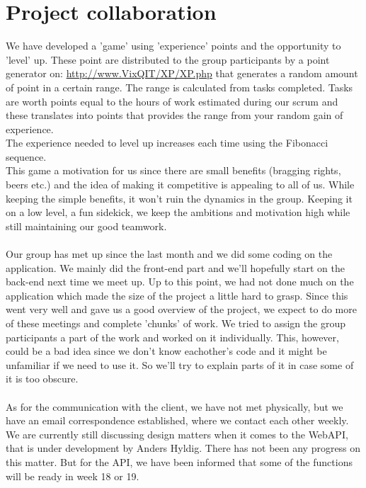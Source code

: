 \documentclass[12pt]{article}
\begin{document}
\section{Project collaboration}
We have developed a 'game' using 'experience' points and the opportunity to 'level' up. These point are distributed to the group participants by a point generator on: \url{http://www.VixQIT/XP/XP.php}
that generates a random amount of point in a certain range. The range is calculated from tasks completed. Tasks are worth points equal to the hours of work estimated during our scrum and these translates into points that provides the range from your random gain of experience.\\
The experience needed to level up increases each time using the Fibonacci sequence.\\
This game a motivation for us since there are small benefits (bragging rights, beers etc.) and the idea of making it competitive is appealing to all of us. While keeping the simple benefits, it won't ruin the dynamics in the group. Keeping it on a low level, a fun sidekick, we keep the ambitions and motivation high while still maintaining our good teamwork.\\
\\
Our group has met up since the last month and we did some coding on the application. We mainly did the front-end part and we'll hopefully start on the back-end next time we meet up. Up to this point, we had not done much on the application which made the size of the project a little hard to grasp. Since this went very well and gave us a good overview of the project, we expect to do more of these meetings and complete 'chunks' of work.
We tried to assign the group participants a part of the work and worked on it individually. This, however, could be a bad idea since we don't know eachother's code and it might be unfamiliar if we need to use it. So we'll try to explain parts of it in case some of it is too obscure.\\
\\
As for the communication with the client, we have not met physically, but we have an email correspondence established, where we contact each other weekly. We are currently still discussing design matters when it comes to the WebAPI, that is under development by Anders Hyldig. There has not been any progress on this matter. But for the API, we have been informed that some of the functions will be ready in week 18 or 19.
\end{document}
